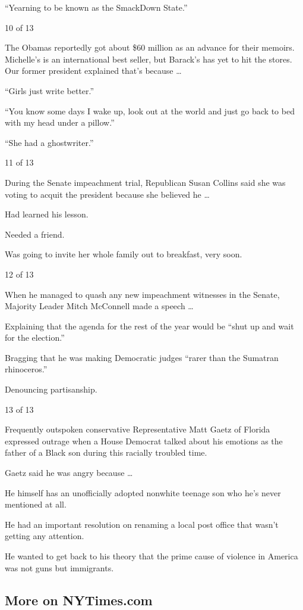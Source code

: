 ``Yearning to be known as the SmackDown State.''

10 of 13

The Obamas reportedly got about \$60 million as an advance for their
memoirs. Michelle's is an international best seller, but Barack's has
yet to hit the stores. Our former president explained that's because
\ldots{}

``Girls just write better.''

``You know some days I wake up, look out at the world and just go back
to bed with my head under a pillow.''

``She had a ghostwriter.''

11 of 13

During the Senate impeachment trial, Republican Susan Collins said she
was voting to acquit the president because she believed he \ldots{}

Had learned his lesson.

Needed a friend.

Was going to invite her whole family out to breakfast, very soon.

12 of 13

When he managed to quash any new impeachment witnesses in the Senate,
Majority Leader Mitch McConnell made a speech \ldots{}

Explaining that the agenda for the rest of the year would be ``shut up
and wait for the election.''

Bragging that he was making Democratic judges ``rarer than the Sumatran
rhinoceros.''

Denouncing partisanship.

13 of 13

Frequently outspoken conservative Representative Matt Gaetz of Florida
expressed outrage when a House Democrat talked about his emotions as the
father of a Black son during this racially troubled time.

Gaetz said he was angry because \ldots{}

He himself has an unofficially adopted nonwhite teenage son who he's
never mentioned at all.

He had an important resolution on renaming a local post office that
wasn't getting any attention.

He wanted to get back to his theory that the prime cause of violence in
America was not guns but immigrants.

\hypertarget{more-on-nytimescom}{%
\subsection{More on NYTimes.com}\label{more-on-nytimescom}}

